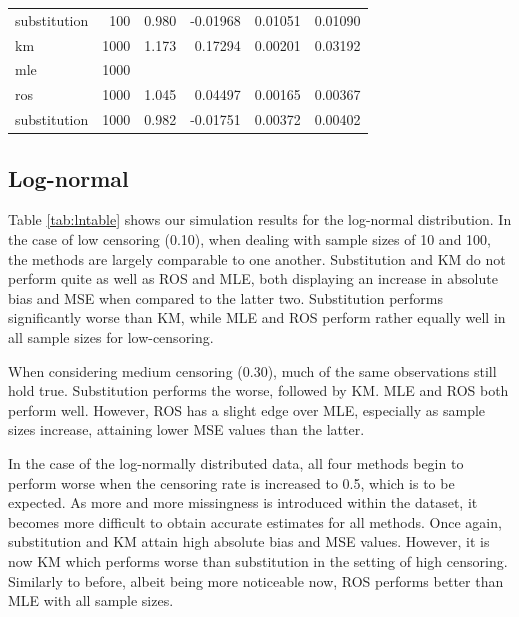 \documentclass[12pt, twoside]{amherstthesis}
\begin{document}
\begin{table}
\begin{tabular}[t]{lrrrrr}
\hspace{1em}substitution & 100 & 0.980 & -0.01968 & 0.01051 & 0.01090\\
\hspace{1em}km & 1000 & 1.173 & 0.17294 & 0.00201 & 0.03192\\
\hspace{1em}mle & 1000 &  &  &  & \\
\hspace{1em}ros & 1000 & 1.045 & 0.04497 & 0.00165 & 0.00367\\
\hspace{1em}substitution & 1000 & 0.982 & -0.01751 & 0.00372 & 0.00402\\
\bottomrule
\end{tabular}
\end{table}
\hypertarget{log-normalsimstudy}{%
\subsection{Log-normal}\label{log-normalsimstudy}}

Table \ref{tab:lntable} shows our simulation results for the log-normal distribution. In the case of low censoring (0.10), when dealing with sample sizes of 10 and 100, the methods are largely comparable to one another. Substitution and KM do not perform quite as well as ROS and MLE, both displaying an increase in absolute bias and MSE when compared to the latter two. Substitution performs significantly worse than KM, while MLE and ROS perform rather equally well in all sample sizes for low-censoring.

When considering medium censoring (0.30), much of the same observations still hold true. Substitution performs the worse, followed by KM. MLE and ROS both perform well. However, ROS has a slight edge over MLE, especially as sample sizes increase, attaining lower MSE values than the latter.

In the case of the log-normally distributed data, all four methods begin to perform worse when the censoring rate is increased to 0.5, which is to be expected. As more and more missingness is introduced within the dataset, it becomes more difficult to obtain accurate estimates for all methods. Once again, substitution and KM attain high absolute bias and MSE values. However, it is now KM which performs worse than substitution in the setting of high censoring. Similarly to before, albeit being more noticeable now, ROS performs better than MLE with all sample sizes.
\end{document}
